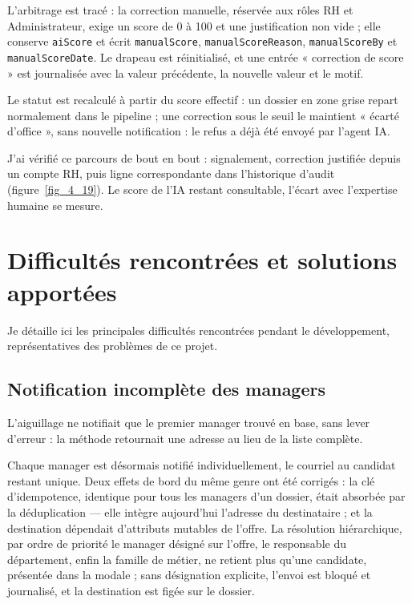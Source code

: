 \documentclass[]{./tpl/isipfe}
\begin{document}
L’arbitrage est tracé : la correction manuelle, réservée aux rôles RH et Administrateur, exige un score de 0 à 100 et une justification non vide ; elle conserve \texttt{aiScore} et écrit \texttt{manualScore}, \texttt{manualScoreReason}, \texttt{manualScoreBy} et \texttt{manualScoreDate}. Le drapeau est réinitialisé, et une entrée « correction de score » est journalisée avec la valeur précédente, la nouvelle valeur et le motif.

Le statut est recalculé à partir du score effectif : un dossier en zone grise repart normalement dans le pipeline ; une correction sous le seuil le maintient « écarté d’office », sans nouvelle notification : le refus a déjà été envoyé par l’agent IA.

J’ai vérifié ce parcours de bout en bout : signalement, correction justifiée depuis un compte RH, puis ligne correspondante dans l’historique d’audit (figure~\ref{fig_4_19}). Le score de l’IA restant consultable, l’écart avec l’expertise humaine se mesure.

\section{Difficultés rencontrées et solutions apportées}
\label{sec_4_5}
Je détaille ici les principales difficultés rencontrées pendant le développement, représentatives des problèmes de ce projet.

\subsection{Notification incomplète des managers}
\label{sec_4_5_1}
L’aiguillage ne notifiait que le premier manager trouvé en base, sans lever d’erreur : la méthode retournait une adresse au lieu de la liste complète.

Chaque manager est désormais notifié individuellement, le courriel au candidat restant unique. Deux effets de bord du même genre ont été corrigés : la clé d’idempotence, identique pour tous les managers d’un dossier, était absorbée par la déduplication — elle intègre aujourd’hui l’adresse du destinataire ; et la destination dépendait d’attributs mutables de l’offre. La résolution hiérarchique, par ordre de priorité le manager désigné sur l’offre, le responsable du département, enfin la famille de métier, ne retient plus qu’une candidate, présentée dans la modale ; sans désignation explicite, l’envoi est bloqué et journalisé, et la destination est figée sur le dossier.
\end{document}
